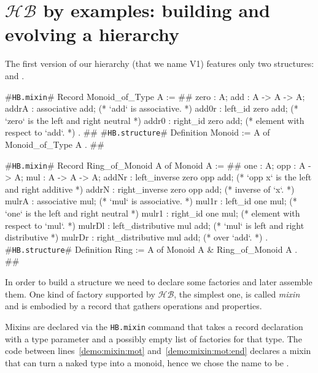 \documentclass[a4paper,UKenglish,cleveref, autoref]{lipics-v2019}
\newcommand{\HB}{\ensuremath{\mathcal{HB}}}
\newcommand{\mixin}{mixin}
\newcommand{\mixins}{mixins}
\newcommand{\Mixins}{Mixins}
\newcommand{\factory}{factory}
\newcommand{\factories}{factories}
\newcommand{\hbmixin}{{\tt\color{dkgreen}HB.mixin}}
\newcommand{\hbstructure}{{\tt\color{dkgreen}HB.structure}}
\theoremstyle{implem}
\theoremstyle{implem}
\theoremstyle{command}
\begin{document}
\section{\HB{} by examples: building and evolving a hierarchy}
\label{sec:example}

The first version of our hierarchy (that we name V1) features only two
structures:  and .
\begin{coqcode}
#\hbmixin{}# Record Monoid_of_Type A := {                       #\label{demo:mixin:mot}#
  zero : A;
  add : A -> A -> A;
  addrA : associative add;             (* `add` is associative.                   *)
  add0r : left_id zero add;            (* `zero` is the left and right neutral    *)
  addr0 : right_id zero add;           (*   element with respect to `add`.        *)
}.                                                             #\label{demo:mixin:mot:end}#
#\hbstructure{}# Definition Monoid := { A of Monoid_of_Type A }.        #\label{demo:structure:monoid}#

#\hbmixin{}# Record Ring_of_Monoid A of Monoid A := {       #\label{demo:mixin:rom}#
  one : A;
  opp : A -> A;
  mul : A -> A -> A;
  addNr : left_inverse zero opp add;   (* `opp x` is the left and right additive  *)
  addrN : right_inverse zero opp add;  (*   inverse of `x`.                       *)
  mulrA : associative mul;             (* `mul` is associative.                   *)
  mul1r : left_id one mul;             (* `one` is the left and right neutral     *)
  mulr1 : right_id one mul;            (*   element with respect to `mul`.        *)
  mulrDl : left_distributive mul add;  (* `mul` is left and right distributive    *)
  mulrDr : right_distributive mul add; (*   over `add`.                           *)
}.
#\hbstructure{}# Definition Ring := { A of Monoid A & Ring_of_Monoid A }. #\label{demo:structure:ring}#

\end{coqcode}

In order to build a structure we need to declare some \factories{} and
later assemble them. One kind of \factory{} supported by \HB{}, the simplest
one, is called \emph{\mixin{}} and is embodied by a record
that gathers operations and properties.

\Mixins{} are declared via the \hbmixin{} command
that takes a record declaration with
a type parameter and a possibly empty list of \factories{} for that type.
The code between lines~\ref{demo:mixin:mot}
and~\ref{demo:mixin:mot:end} declares a \mixin{} that can turn a naked
type  into a monoid, hence we chose the name to be .
\end{document}

